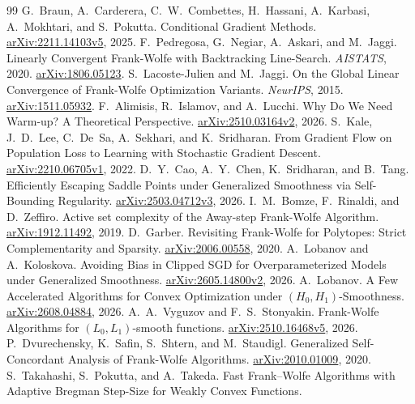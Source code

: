 \begin{thebibliography}{99}
 G.~Braun, A.~Carderera, C.~W.~Combettes, H.~Hassani,
A.~Karbasi, A.~Mokhtari, and S.~Pokutta. Conditional Gradient Methods.
\href{https://arxiv.org/abs/2211.14103v5}{arXiv:2211.14103v5}, 2025.
 F.~Pedregosa, G.~Negiar, A.~Askari, and M.~Jaggi.
Linearly Convergent Frank-Wolfe with Backtracking Line-Search.
\emph{AISTATS}, 2020. \href{https://arxiv.org/abs/1806.05123}{arXiv:1806.05123}.
 S.~Lacoste-Julien and M.~Jaggi.
On the Global Linear Convergence of Frank-Wolfe Optimization Variants.
\emph{NeurIPS}, 2015.
\href{https://arxiv.org/abs/1511.05932}{arXiv:1511.05932}.
 F.~Alimisis, R.~Islamov, and A.~Lucchi.
Why Do We Need Warm-up? A Theoretical Perspective.
\href{https://arxiv.org/abs/2510.03164v2}{arXiv:2510.03164v2}, 2026.
 S.~Kale, J.~D.~Lee, C.~De~Sa, A.~Sekhari, and K.~Sridharan.
From Gradient Flow on Population Loss to Learning with Stochastic Gradient Descent.
\href{https://arxiv.org/abs/2210.06705v1}{arXiv:2210.06705v1}, 2022.
 D.~Y.~Cao, A.~Y.~Chen, K.~Sridharan, and B.~Tang.
Efficiently Escaping Saddle Points under Generalized Smoothness via Self-Bounding Regularity.
\href{https://arxiv.org/abs/2503.04712v3}{arXiv:2503.04712v3}, 2026.
 I.~M.~Bomze, F.~Rinaldi, and D.~Zeffiro.
Active set complexity of the Away-step Frank-Wolfe Algorithm.
\href{https://arxiv.org/abs/1912.11492}{arXiv:1912.11492}, 2019.
 D.~Garber.
Revisiting Frank-Wolfe for Polytopes: Strict Complementarity and Sparsity.
\href{https://arxiv.org/abs/2006.00558}{arXiv:2006.00558}, 2020.
 A.~Lobanov and A.~Koloskova.
Avoiding Bias in Clipped SGD for Overparameterized Models under Generalized Smoothness.
\href{https://arxiv.org/abs/2605.14800v2}{arXiv:2605.14800v2}, 2026.
 A.~Lobanov.
A Few Accelerated Algorithms for Convex Optimization under $(H_0,H_1)$-Smoothness.
\href{https://arxiv.org/abs/2608.04884}{arXiv:2608.04884}, 2026.
 A.~A.~Vyguzov and F.~S.~Stonyakin.
Frank-Wolfe Algorithms for $(L_0,L_1)$-smooth functions.
\href{https://arxiv.org/abs/2510.16468v5}{arXiv:2510.16468v5}, 2026.
 P.~Dvurechensky, K.~Safin, S.~Shtern, and M.~Staudigl.
Generalized Self-Concordant Analysis of Frank-Wolfe Algorithms.
\href{https://arxiv.org/abs/2010.01009}{arXiv:2010.01009}, 2020.
 S.~Takahashi, S.~Pokutta, and A.~Takeda.
Fast Frank--Wolfe Algorithms with Adaptive Bregman Step-Size for Weakly Convex Functions.

\end{thebibliography}
